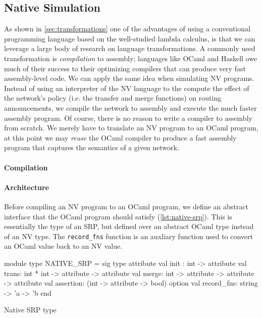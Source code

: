 \documentclass[sigconf,10pt]{acmart}
\begin{document}
\subsection{Native Simulation}
As shown in \cref{sec:transformations} one of the advantages of using a
conventional programming language based on the well-studied lambda calculus, is
that we can leverage a large body of research on language transformations. A
commonly used transformation is \emph{compilation} to assembly; languages like
OCaml and Haskell owe much of their success to their optimizing compilers that
can produce very fast assembly-level code. We can apply the same idea when
simulating NV programs. Instead of using an interpreter of the NV language to
the compute the effect of the network's policy (i.e. the transfer and merge
functions) on routing announcements, we compile the network to assembly and
execute the much faster assembly program. Of course, there is no reason to write
a compiler to assembly from scratch. We merely have to translate an NV program
to an OCaml program, at this point we may \emph{reuse} the OCaml compiler to
produce a fast assembly program that captures the semantics of a given network.

\paragraph{Compilation}

\paragraph{Architecture}
Before compiling an NV program to an OCaml program, we define an abstract
interface that the OCaml program should satisfy (\cref{lst:native-srp}). This is
essentially the type of an SRP, but defined over an abstract OCaml type instead
of an NV type. The \texttt{record\_fns} function is an auxliary function used to
convert an OCaml value back to an NV value.

\begin{listing}[ht]
  \begin{ocamlcode}
  module type NATIVE_SRP =
    sig
      type attribute
      val init : int -> attribute
      val trans: int * int -> attribute -> attribute
      val merge: int -> attribute -> attribute -> attribute
      val assertion: (int -> attribute -> bool) option
      val record_fns: string -> 'a -> 'b
    end
  \end{ocamlcode}
\caption{Native SRP type}
\label{lst:native-srp}
\end{listing}
\end{document}

